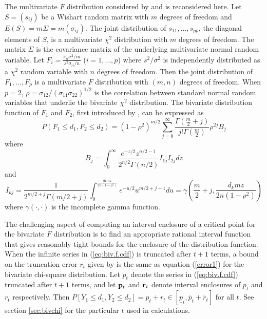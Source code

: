 \documentclass[10pt,letterpaper]{article}
\begin{document}
The multivariate $F$ distribution considered by
\cite{Krishnaiah75} and \cite{Krishnaiah80} is reconsidered here.
Let $S = (s_{ij})$ be a Wishart random matrix with $m$ degrees of 
freedom and 
$E(S) = m\Sigma = m(\sigma_{ij})$.  The joint distribution of
$s_{11},\ldots,s_{pp}$, the diagonal
elements of $S$, is a multivariate $\chi^2$ 
distribution with $m$ degrees of freedom.  The matrix $\Sigma$ is the
covariance matrix of the underlying multivariate normal random variable.
Let $F_i = \frac{s_{ii} \sigma^2/m }{s^2\sigma_{ii}/n}$ 
($i = 1,\ldots,p$) where $s^2/\sigma^2$ is independently 
distributed as a $\chi^2$ random variable with $n$ degrees of freedom.
Then the joint distribution of $F_1, \ldots, F_p$ is a multivariate $F$
distribution with $(m,n)$ degrees of freedom.  When $p = 2$, 
$\rho = \sigma_{12}/{(\sigma_{11}\sigma_{22})}^{1/2}$
is the correlation between standard normal random
variables that underlie the bivariate $\chi^2$ distribution.
The bivariate distribution function of $F_1$ and $F_2$, 
first introduced by \cite{Krishnaiah65}, can be expressed as 
\begin{equation}
\label{eq:biv.f.cdf}
P(F_1 \leq d_1, F_2 \leq d_2) =
  (1-\rho^2)^{m/2} 
  \sum_{j=0}^\infty 
  \frac{\Gamma (\frac{m}{2}+j)}{j! \Gamma (\frac{m}{2})} 
  \rho^{2j} B_j
\end{equation}
where
$$ 
B_j = \int_0^\infty \frac{e^{-z/2} z^{n/2-1}}{2^{n/2} \Gamma (n/2)} 
        I_{1j} I_{2j} dz
$$
and 
\begin{equation}
I_{kj} =   \frac{1}{2^{m/2+j} \Gamma (m/2 +j)} 
     \int_0^{\frac{d_k m z}{2n(1-\rho^2)}} e^{-u/2} u^{m/2+j-1} du 
  = \gamma\left(\frac{m}{2}+j, \frac{d_k m z}{2n(1-\rho^2)}\right)
\end{equation}
where $\gamma(\cdot, \cdot) $ is the incomplete gamma function. 

The challenging aspect of computing an interval
enclosure of a critical point for the
bivariate $F$ distribution is to find an appropriate rational interval 
function that gives reasonably tight bounds for the enclosure of the
distribution function.
When the infinite series in (\ref{eq:biv.f.cdf}) is 
truncated after $t+1$ terms, 
a bound on the truncation error $r_t$ given by \cite{Krishnaiah75} is
the same as equation (\ref{error1}) for the bivariate chi-square distribution.
Let $p_t$ denote the series in (\ref{eq:biv.f.cdf}) 
truncated after $t+1$ terms, and
let ${\bf p}_t$ and ${\bf r}_t$ denote interval enclosures of $p_t$ and $r_t$
respectively.  Then 
$P[Y_1 \leq d_1, Y_2 \leq d_2] = p_t + r_t \in
[ \underline{p}_t , \overline{p}_t + \overline{r}_t]$ for all $t$.  See
section \ref{sec:bivchi} for the particular $t$ used in calculations.
\end{document}
